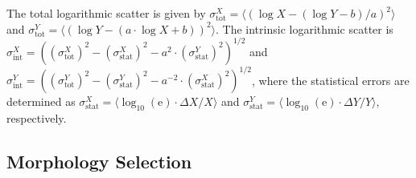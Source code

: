 \documentclass[structabstract]{aa}
\begin{document}
The total logarithmic scatter is given by
$\sigma^{X}_{\text{tot}}=\langle ( \log X-(\log Y -b)/a)^2 \rangle$ and $\sigma^{Y}_{\text{tot}}=\langle ( \log Y-(a \cdot \log X +b))^2 \rangle$. The intrinsic logarithmic scatter is $\sigma^{X}_{\text{int}}=\left((\sigma^{X}_{\text{tot}})^2-(\sigma^{X}_{\text{stat}})^{2}-a^{2}\cdot(\sigma^{Y}_{\text{stat}})^{2}\right)^{1/2}$ and $\sigma^{Y}_{\text{int}}=\left((\sigma^{Y}_{\text{tot}})^2-(\sigma^{Y}_{\text{stat}})^{2}-a^{-2}\cdot(\sigma^{X}_{\text{stat}})^{2}\right)^{1/2}$, where the statistical errors are determined as $\sigma^{X}_{\text{stat}}=\langle\log_{10}(\text{e})\cdot\Delta X/X\rangle$ and $\sigma^{Y}_{\text{stat}}=\langle \log_{10}(\text{e})\cdot\Delta Y/Y\rangle$, respectively.
%
 \subsection{Morphology Selection} \label{sec:morphology}
\end{document}
